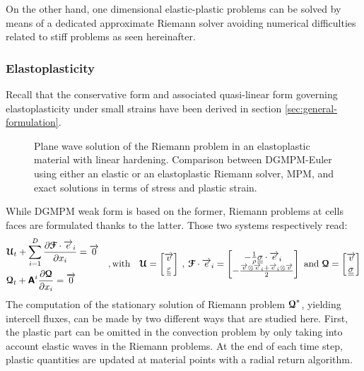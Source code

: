 On the other hand, one dimensional elastic-plastic problems can be solved by means of a dedicated approximate Riemann solver avoiding numerical difficulties related to stiff problems as seen hereinafter.

\subsubsection{Elastoplasticity}
Recall that the conservative form and associated quasi-linear form governing elastoplasticity under small strains have been derived in section \ref{sec:general-formulation}.
\begin{figure}[h!]
  \centering
  { \label{subfig:ep_dgmpm_mpm1}}
  { \label{subfig:ep_dgmpm_mpm3}}
  {}
  \caption{Plane wave solution of the Riemann problem in an elastoplastic material with linear hardening. Comparison between DGMPM-Euler using either an elastic or an elastoplastic Riemann solver, MPM, and exact solutions in terms of stress and plastic strain.}
  \label{fig:RP_EP_dgmpm_mpm}
\end{figure}
While DGMPM weak form is based on the former, Riemann problems at cells faces are formulated thanks to the latter. Those two systems respectively read:
\begin{equation*}
  \begin{aligned}
  & {\boldsymbol{\mathcal{U}}}_t + \sum_{i=1}^D \frac{\partial {\boldsymbol{\mathcal{F}}}\cdot {\overrightarrow{e}}_i}{\partial x_i} = {\overrightarrow{0}} \\
  & {\boldsymbol{\mathcal{Q}}}_t + \boldsymbol{\mathsf{A}}^i \frac{\partial {\boldsymbol{\mathcal{Q}}}}{\partial x_i} = {\overrightarrow{0}}
  \end{aligned} \quad,\text{with}\quad {\boldsymbol{\mathcal{U}}} =\left[\begin{matrix}{\overrightarrow{v}} \\ {\underline{\underline{\varepsilon}}}\end{matrix}\right] \:,\: {\boldsymbol{\mathcal{F}}}\cdot{\overrightarrow{e}}_i = \left[\begin{matrix}-\frac{1}{\rho}{\underline{\underline{\sigma}}}\cdot{\overrightarrow{e}}_i\\-\frac{{\overrightarrow{v}}\otimes{\overrightarrow{e}}_i +{\overrightarrow{e}}_i \otimes{\overrightarrow{v}} }{2} \end{matrix}\right] \text{ and } {\boldsymbol{\mathcal{Q}}}=\left[\begin{matrix}{\overrightarrow{v}}\\ {\underline{\underline{\sigma}}}\end{matrix}\right]
\end{equation*}
The computation of the stationary solution of Riemann problem ${\boldsymbol{\mathcal{Q}}}^*$, yielding intercell fluxes, can be made by two different ways that are studied here.
First, the plastic part can be omitted in the convection problem by only taking into account elastic waves in the Riemann problems. At the end of each time step, plastic quantities are updated at material points with a radial return algorithm. %

